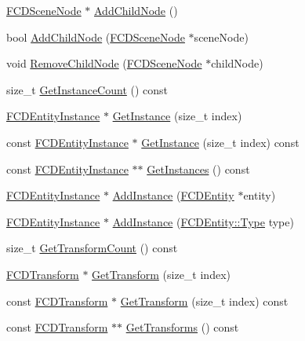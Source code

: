 \begin{DoxyCompactItemize}
\item 
\hyperlink{classFCDSceneNode}{FCDSceneNode} $\ast$ \hyperlink{classFCDSceneNode_a1d2cca80ae66e0ceef9a093e37284b03}{AddChildNode} ()
\item 
bool \hyperlink{classFCDSceneNode_a2aa73a31353db13b3c9cb9931c8479e8}{AddChildNode} (\hyperlink{classFCDSceneNode}{FCDSceneNode} $\ast$sceneNode)
\item 
void \hyperlink{classFCDSceneNode_a07a1b64efd68b7a88b42cff860347859}{RemoveChildNode} (\hyperlink{classFCDSceneNode}{FCDSceneNode} $\ast$childNode)
\item 
size\_\-t \hyperlink{classFCDSceneNode_a191a57fdbb1ae5ddab8b45b4d4984e63}{GetInstanceCount} () const 
\item 
\hyperlink{classFCDEntityInstance}{FCDEntityInstance} $\ast$ \hyperlink{classFCDSceneNode_a5289e4d1feedb3af83a0719d04da348e}{GetInstance} (size\_\-t index)
\item 
const \hyperlink{classFCDEntityInstance}{FCDEntityInstance} $\ast$ \hyperlink{classFCDSceneNode_adaee3075febbaa2443fba9bd6c1fe56b}{GetInstance} (size\_\-t index) const 
\item 
const \hyperlink{classFCDEntityInstance}{FCDEntityInstance} $\ast$$\ast$ \hyperlink{classFCDSceneNode_a5a027253c1b201a213404b3635be224a}{GetInstances} () const 
\item 
\hyperlink{classFCDEntityInstance}{FCDEntityInstance} $\ast$ \hyperlink{classFCDSceneNode_a38826dd9b894ad2371511f0228cb04c0}{AddInstance} (\hyperlink{classFCDEntity}{FCDEntity} $\ast$entity)
\item 
\hyperlink{classFCDEntityInstance}{FCDEntityInstance} $\ast$ \hyperlink{classFCDSceneNode_ac9133483ba61e9b690d4ff0509678255}{AddInstance} (\hyperlink{classFCDEntity_a9301a4bd5f4d4190ec13e40db4effdd7}{FCDEntity::Type} type)
\item 
size\_\-t \hyperlink{classFCDSceneNode_a3767ecd3e9c672a4e13e7185ccd7305c}{GetTransformCount} () const 
\item 
\hyperlink{classFCDTransform}{FCDTransform} $\ast$ \hyperlink{classFCDSceneNode_a77f7cd7f791b74d161f5b0a88d21018c}{GetTransform} (size\_\-t index)
\item 
const \hyperlink{classFCDTransform}{FCDTransform} $\ast$ \hyperlink{classFCDSceneNode_aa21348079b3e12aaa49ffa80c931bc97}{GetTransform} (size\_\-t index) const 
\item 
const \hyperlink{classFCDTransform}{FCDTransform} $\ast$$\ast$ \hyperlink{classFCDSceneNode_a76eb38bae0f0388e8f7aea9d193b0f74}{GetTransforms} () const 

\end{DoxyCompactItemize}
